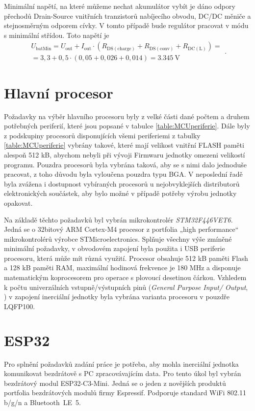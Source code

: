 Minimální napětí, na které můžeme nechat akumulátor vybít je dáno odpory přechodů Drain-Source vnitřních tranzistorů nabíjecího obvodu, DC/DC měniče a stejnosměrným odporem cívky. V tomto případě bude regulátor pracovat v módu s minimální střídou. \cite{mGnys3WmOkWuaQHN} Toto napětí je
\begin{equation}
\begin{matrix}
 U_{\mathrm{batMin}} = U_{\mathrm{out}} + I_{\mathrm{out}} \cdot (R_{\mathrm{DS(charge)}} + R_{\mathrm{DS(conv)}} + R_{\mathrm{DC(L)}})= \\
  =3,3 + 0,5 \cdot (0,05 + 0,026 + 0,014) = \SI{3,345}{\volt}
\end{matrix} .
 \end{equation}

\section{Hlavní procesor}
Požadavky na výběr hlavního procesoru byly z velké části dané počtem a druhem potřebných periferií, které jsou popsané v tabulce \ref{table:MCUperiferie}.
Dále byly z podskupiny procesorů disponujících všemi periferiemi z tabulky \ref{table:MCUperiferie} vybrány takové, které mají velikost vnitřní FLASH paměti alespoň 512 kB, abychom nebyli při vývoji Firmwaru jednotky omezeni velikostí programu. Pouzdra procesorů byla vybrána taková, aby se s nimi dalo jednoduše pracovat, z toho důvodu byla vyloučena pouzdra typu \ac{BGA}. 
V neposlední řadě byla zvážena i dostupnost vybíraných procesorů u nejobvyklejších distributorů elektronických součástek, aby bylo možné v případě potřeby výrobu jednotky opakovat.



Na základě těchto požadavků byl vybrán mikrokontrolér \emph{STM32F446VET6}. Jedná se o 32bitový ARM Cortex-M4 procesor z portfolia „high performance“ mikrokontrolérů výrobce STMicroelectronics. Splňuje všechny výše zmíněné minimální požadavky, v obvodovém zapojení byla použita i USB periferie procesoru, která může mít různá využití. Procesor obsahuje 512 kB paměti Flash a 128 kB paměti RAM, maximální hodinová frekvence je 180 MHz a disponuje matematickým koprocesorem pro operace s plovoucí desetinou čárkou. Vzhledem k počtu univerzálních vstupně/výstupních pinů (\emph{General Purpose Input/
Output}, ) v zapojení inerciální jednotky byla vybrána varianta procesoru v pouzdře LQFP100. \cite{csdGtKJDMSdbwJ9r}

\section{ESP32}
Pro splnění požadavků zadání práce je potřeba, aby mohla inerciální jednotka komunikovat bezdrátově s PC zpracovávajícím data. Pro tento úkol byl vybrán bezdrátový modul ESP32-C3-Mini. Jedná se o jeden z novějších produktů portfolia bezdrátových modulů firmy Espressif. Podporuje standard WiFi 802.11 b/g/n a Bluetooth~LE~5. \cite{zJ7x5ye8Y5eJn1E2}

